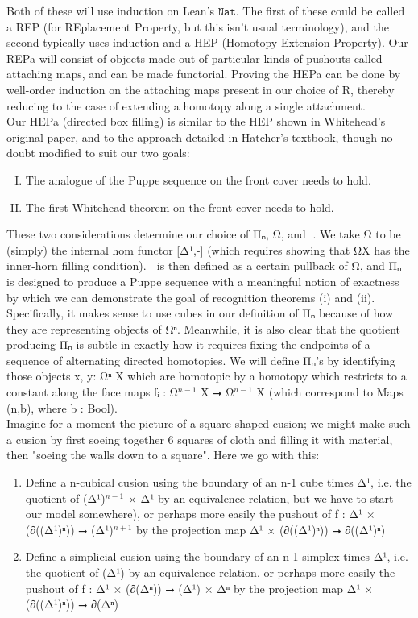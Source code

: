 \documentclass{book}
\theoremstyle{definition}
\begin{document}
Both of these will use induction on Lean's $\texttt{Nat}$. The first of these could be called a REP (for REplacement Property, but this isn't usual terminology), and the second typically uses induction and a HEP (Homotopy Extension Property). Our REPa will consist of objects made out of particular kinds of pushouts called attaching maps, and can be made functorial. Proving the HEPa can be done by well-order induction on the attaching maps present in our choice of R, thereby reducing to the case of extending a homotopy along a single attachment.\\

Our HEPa (directed box filling) is similar to the HEP shown in Whitehead's original paper, and to the approach detailed in Hatcher's textbook, though no doubt modified to suit our two goals:

\begin{enumerate}[(I)]
\item The analogue of the Puppe sequence on the front cover needs to hold.
\item The first Whitehead theorem on the front cover needs to hold.
\end{enumerate}

These two considerations determine our choice of Π⃗ₙ, Ω⃗, and ω⃗. We take Ω⃗ to be (simply) the internal hom functor [Δ¹,-] (which requires showing that Ω⃗X has the inner-horn filling condition). ω⃗ is then defined as a certain pullback of Ω⃗, and Π⃗ₙ is designed to produce a Puppe sequence with a meaningful notion of exactness by which we can demonstrate the goal of recognition theorems (i) and (ii). Specifically, it makes sense to use cubes in our definition of Π⃗ₙ because of how they are representing objects of Ω⃗ⁿ. Meanwhile, it is also clear that the quotient producing Π⃗ₙ is subtle in exactly how it requires fixing the endpoints of a sequence of alternating directed homotopies. We will define Π⃗ₙ's by identifying those objects x, y: Ω⃗ⁿ X which are homotopic by a homotopy which restricts to a constant along the face maps fᵢ : Ω⃗${}^{n-1}$ X ⭢ Ω⃗${}^{n-1}$ X (which correspond to Maps (n,b), where b : Bool).\\

Imagine for a moment the picture of a square shaped cusion; we might make such a cusion by first soeing together 6 squares of cloth and filling it with material, then "soeing the walls down to a square". Here we go with this:

\begin{enumerate}
\item Define a n-cubical cusion using the boundary of an n-1 cube times Δ¹, i.e. the quotient of (Δ¹)${}^{n-1}$ × Δ¹ by an equivalence relation, but we have to start our model somewhere), or perhaps more easily the pushout of f : Δ¹ × (∂((Δ¹)ⁿ)) ⭢ (Δ¹)${}^{n+1}$ by the projection map Δ¹ × (∂((Δ¹)ⁿ)) ⭢ ∂((Δ¹)ⁿ)
\item Define a simplicial cusion using the boundary of an n-1 simplex times Δ¹, i.e. the quotient of (Δ¹) by an equivalence relation, or perhaps more easily the pushout of f : Δ¹ × (∂(Δⁿ)) ⭢ (Δ¹) × Δⁿ by the projection map Δ¹ × (∂((Δ¹)ⁿ)) ⭢ ∂(Δⁿ)
\end{enumerate}
\end{document}
